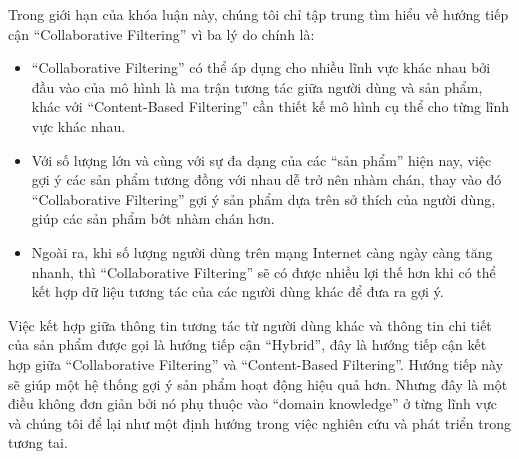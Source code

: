 Trong giới hạn của khóa luận này, chúng tôi chỉ tập trung tìm hiểu về hướng tiếp cận ``Collaborative Filtering'' 
vì ba lý do chính là:
\begin{itemize}
\item ``Collaborative Filtering'' có thể áp dụng cho nhiều lĩnh vực khác nhau bởi đầu vào của mô hình là ma trận tương tác giữa người dùng và sản phẩm, khác với ``Content-Based Filtering'' cần thiết kế mô hình cụ thể cho từng lĩnh vực khác nhau.
\item Với số lượng lớn và cùng với sự đa dạng của các ``sản phẩm'' hiện nay, việc gợi ý các sản phẩm tương đồng với nhau dễ trở nên nhàm chán, thay vào đó ``Collaborative Filtering'' gợi ý sản phẩm dựa trên sở thích của người dùng, giúp các sản phẩm bớt nhàm chán hơn.
\item Ngoài ra, khi số lượng người dùng trên mạng Internet càng ngày càng tăng nhanh, thì ``Collaborative Filtering'' 
sẽ có được nhiều lợi thế hơn khi có thể kết hợp dữ liệu tương tác của các người dùng khác để đưa ra gợi ý.
\end{itemize}

Việc kết hợp giữa thông tin tương tác từ người dùng khác và thông tin chi tiết của sản phẩm được gọi là hướng tiếp cận ``Hybrid'', đây là hướng tiếp cận kết hợp giữa ``Collaborative Filtering'' và ``Content-Based Filtering''.
Hướng tiếp này sẽ giúp một hệ thống gợi ý sản phẩm hoạt động hiệu quả hơn. Nhưng đây là một điều không đơn giản bởi nó phụ thuộc vào ``domain knowledge'' ở từng lĩnh vực và chúng tôi để lại như một định hướng trong việc nghiên cứu và phát triển trong tương tai.

